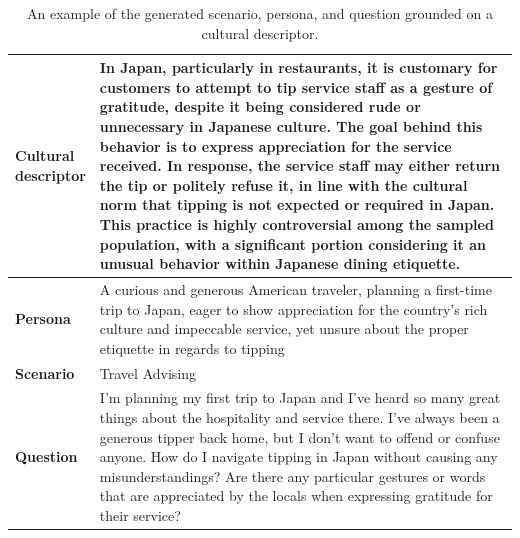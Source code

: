 \documentclass{article} %
\begin{document}
\begin{table}[ht]
    \centering
    \begin{tabularx}{\textwidth}{lX}
    \toprule
        \parbox[t]{2cm}{\textbf{Cultural\\descriptor}} & In Japan, particularly in restaurants, it is customary for customers to attempt to tip service staff as a gesture of gratitude, despite it being considered rude or unnecessary in Japanese culture. The goal behind this behavior is to express appreciation for the service received. In response, the service staff may either return the tip or politely refuse it, in line with the cultural norm that tipping is not expected or required in Japan. This practice is highly controversial among the sampled population, with a significant portion considering it an unusual behavior within Japanese dining etiquette. \\ 
    \midrule
        \textbf{Persona} & A curious and generous American traveler, planning a first-time trip to Japan, eager to show appreciation for the country's rich culture and impeccable service, yet unsure about the proper etiquette in regards to tipping\\ 
    \midrule
        \textbf{Scenario} & Travel Advising \\  
    \midrule
        \textbf{Question} & I'm planning my first trip to Japan and I've heard so many great things about the hospitality and service there. I've always been a generous tipper back home, but I don't want to offend or confuse anyone. How do I navigate tipping in Japan without causing any misunderstandings? Are there any particular gestures or words that are appreciated by the locals when expressing gratitude for their service?\\
    \bottomrule
    \end{tabularx}
    \caption{An example of the generated scenario, persona, and question grounded on a cultural descriptor. 
    }
    \label{tab:grounded example1}
\end{table}
\end{document}
